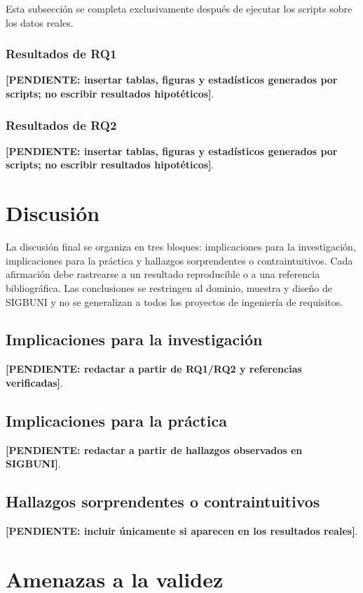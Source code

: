 \documentclass[12pt,journal,onecolumn]{IEEEtran}
\newcommand{\pendiente}[1]{\textcolor{red!70!black}{\textbf{[PENDIENTE: #1]}}}
\begin{document}
Esta subsección se completa exclusivamente después de ejecutar los scripts
sobre los datos reales.

\subsubsection{Resultados de RQ1}
\pendiente{insertar tablas, figuras y estadísticos generados por scripts; no escribir resultados hipotéticos}.

\subsubsection{Resultados de RQ2}
\pendiente{insertar tablas, figuras y estadísticos generados por scripts; no escribir resultados hipotéticos}.

\section{Discusión}
\label{sec:discusion2b}

La discusión final se organiza en tres bloques: implicaciones para la
investigación, implicaciones para la práctica y hallazgos sorprendentes o
contraintuitivos. Cada afirmación debe rastrearse a un resultado reproducible o
a una referencia bibliográfica. Las conclusiones se restringen al dominio,
muestra y diseño de SIGBUNI y no se generalizan a todos los proyectos de
ingeniería de requisitos.

\subsection{Implicaciones para la investigación}
\pendiente{redactar a partir de RQ1/RQ2 y referencias verificadas}.

\subsection{Implicaciones para la práctica}
\pendiente{redactar a partir de hallazgos observados en SIGBUNI}.

\subsection{Hallazgos sorprendentes o contraintuitivos}
\pendiente{incluir únicamente si aparecen en los resultados reales}.

\section{Amenazas a la validez}
\label{sec:amenazas2b}
\end{document}
